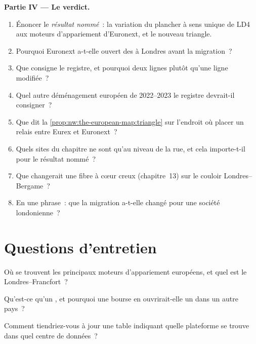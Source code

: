 \begin{problem}
\medskip\noindent\textbf{Partie IV --- Le verdict.}
\begin{enumerate}[resume]
\item Énoncer le \emph{résultat nommé}~: la variation du plancher à sens unique de LD4 aux moteurs d'appariement d'Euronext, et le nouveau triangle.
\item Pourquoi Euronext a-t-elle ouvert des  à Londres avant la migration~?
\item Que consigne le registre, et pourquoi deux lignes plutôt qu'une ligne modifiée~?
\item Quel autre déménagement européen de 2022--2023 le registre devrait-il consigner~?
\item Que dit la \cref{prop:nw:the-european-map:triangle} sur l'endroit où placer un relais entre Eurex et Euronext~?
\item Quels sites du chapitre ne sont qu'au niveau de la rue, et cela importe-t-il pour le résultat nommé~?
\item Que changerait une fibre à cœur creux (chapitre~13) sur le couloir Londres--Bergame~?
\item En une phrase~: que la migration a-t-elle changé pour une société londonienne~?
\end{enumerate}
\end{problem}

\section{Questions d'entretien}

\begin{interviewq}\label{iq:nw:the-european-map:1}
Où se trouvent les principaux moteurs d'appariement européens, et quel est le  Londres--Francfort~?
\end{interviewq}

\begin{interviewq}\label{iq:nw:the-european-map:2}
Qu'est-ce qu'un , et pourquoi une bourse en ouvrirait-elle un dans un autre pays~?
\end{interviewq}

\begin{interviewq}\label{iq:nw:the-european-map:3}
Comment tiendriez-vous à jour une table indiquant quelle plateforme se trouve dans quel centre de données~?
\end{interviewq}

